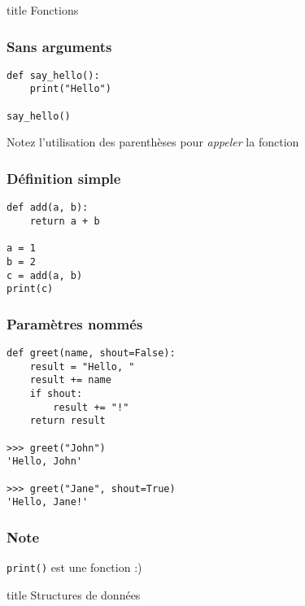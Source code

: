 \documentclass{beamer}
\begin{document}
\begin{frame}[fragile]
  \begin{beamercolorbox}[sep=8pt,center,shadow=true,rounded=true]{title}
    Fonctions
  \end{beamercolorbox}
\end{frame}


\begin{frame}[fragile]
  \frametitle{Sans arguments}

\begin{lstlisting}
def say_hello():
    print("Hello")

say_hello()
\end{lstlisting}

\vfill

Notez l'utilisation des parenthèses pour \emph{appeler} la fonction

\end{frame}


\begin{frame}[fragile]
  \frametitle{Définition simple}

\begin{lstlisting}
def add(a, b):
    return a + b

a = 1
b = 2
c = add(a, b)
print(c)
\end{lstlisting}

\end{frame}

\begin{frame}[fragile]
  \frametitle{Paramètres nommés}
\begin{lstlisting}
def greet(name, shout=False):
    result = "Hello, "
    result += name
    if shout:
        result += "!"
    return result

>>> greet("John")
'Hello, John'

>>> greet("Jane", shout=True)
'Hello, Jane!'
\end{lstlisting}


\end{frame}

\begin{frame}[fragile]
  \frametitle{Note}
\texttt{print()} est une fonction :)
\end{frame}


\begin{frame}[fragile]
  \begin{beamercolorbox}[sep=8pt,center,shadow=true,rounded=true]{title}
    Structures de données
  \end{beamercolorbox}
\end{frame}
\end{document}
